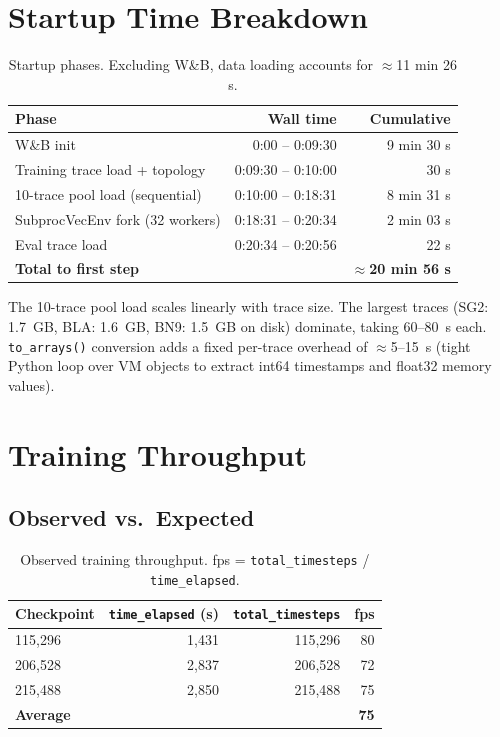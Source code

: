 \documentclass[11pt]{article}
\begin{document}
\section{Startup Time Breakdown}

\begin{table}[h]
\centering
\begin{tabular}{lrr}
\toprule
Phase & Wall time & Cumulative \\
\midrule
W\&B init                      & 0:00 -- 0:09:30 & 9 min 30 s \\
Training trace load + topology  & 0:09:30 -- 0:10:00 & 30 s \\
10-trace pool load (sequential) & 0:10:00 -- 0:18:31 & 8 min 31 s \\
SubprocVecEnv fork (32 workers) & 0:18:31 -- 0:20:34 & 2 min 03 s \\
Eval trace load                 & 0:20:34 -- 0:20:56 & 22 s \\
\midrule
\textbf{Total to first step}    & & \textbf{$\approx$20 min 56 s} \\
\bottomrule
\end{tabular}
\caption{Startup phases. Excluding W\&B, data loading accounts for
$\approx$11 min 26 s.}
\end{table}

The 10-trace pool load scales linearly with trace size. The largest
traces (SG2: 1.7~GB, BLA: 1.6~GB, BN9: 1.5~GB on disk) dominate,
taking 60--80~s each. \texttt{to\_arrays()} conversion adds a fixed
per-trace overhead of $\approx$5--15~s (tight Python loop over VM
objects to extract int64 timestamps and float32 memory values).

\section{Training Throughput}

\subsection{Observed vs.\ Expected}

\begin{table}[h]
\centering
\begin{tabular}{lrrr}
\toprule
Checkpoint & \texttt{time\_elapsed} (s) & \texttt{total\_timesteps} & fps \\
\midrule
115,296  & 1,431 & 115,296 & 80 \\
206,528  & 2,837 & 206,528 & 72 \\
215,488  & 2,850 & 215,488 & 75 \\
\midrule
\textbf{Average} & & & \textbf{75} \\
\bottomrule
\end{tabular}
\caption{Observed training throughput. fps = \texttt{total\_timesteps} /
\texttt{time\_elapsed}.}
\end{table}
\end{document}
